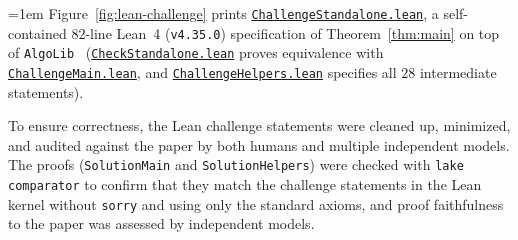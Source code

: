 \documentclass[11pt]{article}
\theoremstyle{definition}
\theoremstyle{remark}
\begin{document}
{\emergencystretch=1em
Figure~\ref{fig:lean-challenge} prints \href{https://github.com/sorrachai/SplayTree-Deque-Ordinal-Inverse-Ackermann-Bound/blob/main/ChallengeStandalone.lean}{\texttt{ChallengeStandalone.\allowbreak lean}}, a self-contained $82$-line Lean~4 (\texttt{v4.35.0}) specification of Theorem~\ref{thm:main} on top of \texttt{AlgoLib}~\cite{AlgoLib2026} (\href{https://github.com/sorrachai/SplayTree-Deque-Ordinal-Inverse-Ackermann-Bound/blob/main/CheckStandalone.lean}{\texttt{CheckStandalone.\allowbreak lean}} proves equivalence with \href{https://github.com/sorrachai/SplayTree-Deque-Ordinal-Inverse-Ackermann-Bound/blob/main/ChallengeMain.lean}{\texttt{ChallengeMain.\allowbreak lean}}, and \href{https://github.com/sorrachai/SplayTree-Deque-Ordinal-Inverse-Ackermann-Bound/blob/main/ChallengeHelpers.lean}{\texttt{ChallengeHelpers.\allowbreak lean}} specifies all $28$ intermediate statements).

To ensure correctness, the Lean challenge statements were cleaned up, minimized, and audited against the paper by both humans and multiple independent models. The proofs (\texttt{SolutionMain} and \texttt{SolutionHelpers}) were checked with \texttt{lake comparator} to confirm that they match the challenge statements in the Lean kernel without \texttt{sorry} and using only the standard axioms, and proof faithfulness to the paper was assessed by independent models.\par}
\end{document}
